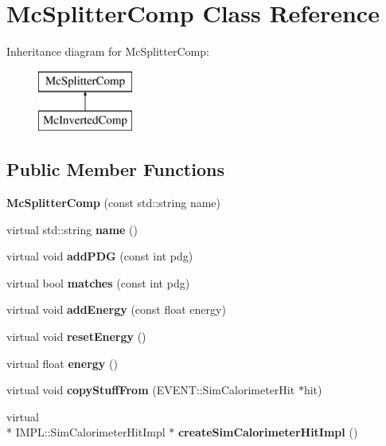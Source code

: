 \section{Mc\-Splitter\-Comp Class Reference}
\label{classMcSplitterComp}
Inheritance diagram for Mc\-Splitter\-Comp\-:\begin{figure}[H]
\begin{center}
\leavevmode
\includegraphics[height=2.000000cm]{classMcSplitterComp}
\end{center}
\end{figure}
\subsection*{Public Member Functions}
\begin{DoxyCompactItemize}
\item 
{\bfseries Mc\-Splitter\-Comp} (const std\-::string name)\label{classMcSplitterComp_a5e3be4628166a5c07964a3b59ed6316b}

\item 
virtual std\-::string {\bfseries name} ()\label{classMcSplitterComp_a2a0ac3a730c7befd38ab667537932fd5}

\item 
virtual void {\bfseries add\-P\-D\-G} (const int pdg)\label{classMcSplitterComp_a7ae84183e5de08aa08826a1570ef062c}

\item 
virtual bool {\bfseries matches} (const int pdg)\label{classMcSplitterComp_a4b5d625f2ad7b7f740203ab33f065ae6}

\item 
virtual void {\bfseries add\-Energy} (const float energy)\label{classMcSplitterComp_a6a0ce42a9b668115f4df8529ebbfd922}

\item 
virtual void {\bfseries reset\-Energy} ()\label{classMcSplitterComp_a1d74571f28b38b2b7a585cfe43986bc9}

\item 
virtual float {\bfseries energy} ()\label{classMcSplitterComp_a928ad84818b0b16fb948204761cae809}

\item 
virtual void {\bfseries copy\-Stuff\-From} (E\-V\-E\-N\-T\-::\-Sim\-Calorimeter\-Hit $\ast$hit)\label{classMcSplitterComp_a82f114e76b85200ce7ded5914c3c2607}

\item 
virtual \\*
I\-M\-P\-L\-::\-Sim\-Calorimeter\-Hit\-Impl $\ast$ {\bfseries create\-Sim\-Calorimeter\-Hit\-Impl} ()\label{classMcSplitterComp_ad133f4bf8456faeb30e173e6c24a6b2b}

\end{DoxyCompactItemize}


